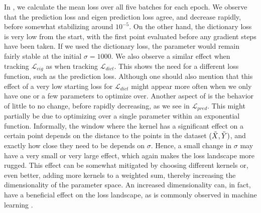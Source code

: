 \documentclass{article}
\begin{document}
In , we calculate the mean loss over all five batches for each epoch. We observe that the prediction loss and eigen prediction loss agree, and decrease rapidly, before somewhat stabilizing around \(10^{-5}\). On the other hand, the dictionary loss is very low from the start, with the first point evaluated before any gradient steps have been taken. If we used the dictionary loss, the parameter would remain fairly stable at the initial \(\sigma=1000\). We also observe a similar effect when tracking \(\mathcal{L}_{eig}\) as when tracking \(\mathcal{L}_{dict}\). This shows the need for a different loss function, such as the prediction loss. Although one should also mention that this effect of a very low starting loss for \(\mathcal{L}_{dict}\) might appear more often when we only have one or a few parameters to optimize over. Another aspect of  is the behavior of little to no change, before rapidly decreasing, as we see in \(\mathcal{L}_{pred}\). This might partially be due to optimizing over a single parameter within an exponential function. Informally, the window where the kernel has a significant effect on a certain point depends on the distance to the points in the dataset \((\Tilde X, \Tilde Y)\), and exactly how close they need to be depends on \(\sigma\). Hence, a small change in \(\sigma\) may have a very small or very large effect, which again makes the loss landscape more rugged. This effect can be somewhat mitigated by choosing different kernels or, even better, adding more kernels to a weighted sum, thereby increasing the dimensionality of the parameter space. An increased dimensionality can, in fact, have a beneficial effect on the loss landscape, as is commonly observed in machine learning \citep{cooper-2021, hastie-2022}.
\end{document}
